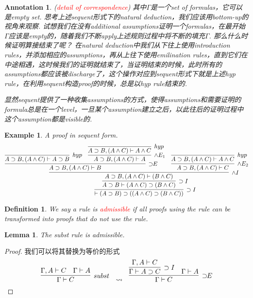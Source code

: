 \documentclass{article}
\theoremstyle{plain}
\newtheorem{lemma}[theorem]{Lemma}
\newtheorem{example}[theorem]{Example}
\newtheorem{definition}[theorem]{Definition}
\newtheorem{annotation}[theorem]{Annotation}
\theoremstyle{nonumberplain}
\newtheorem{proof}{Proof}
\newcommand{\redt}[1]{\textcolor{red}{#1}}
\begin{document}
\begin{annotation}
\rm (\redt{detail of correspondence}) 其中$\Gamma$是一个set of formulas，它可以是empty set. 思考上述sequent形式下的natural deduction，我们应该用bottom-up的视角来观察. 试想我们在没有additional assumptions证明一个formulas，在最开始$\Gamma$应该是empty的，随着我们不断apply上述规则过程中将不断的填充$\Gamma$. 那么什么时候证明算接结束了呢？ 在natural deduction中我们从下往上使用introduction rules，并添加相应的assumptions，再从上往下使用emilination rules，直到它们在中途相遇，这时候我们的证明就结束了，当证明结束的时候，此时所有的assumptions都应该被discharge了，这个操作对应到sequent形式下就是上述hyp rule，在利用sequent构造proof的时候，总是以hyp rule结束的.

显然sequent提供了一种收集assumptions的方式，使得assumptions和需要证明的formula总是在一个level，一旦某个assumption建立之后，以此往后的证明过程中这个assumption都是visible的.    
\end{annotation}

\begin{example}
\rm A proof in sequent form.
$$
\infer[\supset I]{\vdash (A \supset B) \supset ((A\wedge C) \supset (B \wedge C) ) }{\infer[\supset I]{A \supset B \vdash (A\wedge C) \supset (B \wedge C)}{\infer[\wedge I]{A \supset B,(A\wedge C) \vdash  (B \wedge C)}{\infer[\supset\!\!E]{A \supset B,(A\wedge C) \vdash B}{\infer[hyp]{A \supset B,(A\wedge C) \vdash A \supset B}{} & \infer[\wedge E_1]{A \supset B,(A\wedge C) \vdash A}{\infer[hyp]{A \supset B,(A\wedge C) \vdash A \wedge C}{}} } & \infer[\wedge E_2]{A \supset B,(A\wedge C) \vdash C}{\infer[hyp]{A \supset B,(A\wedge C) \vdash A \wedge C}{}}}}}
$$
\end{example}

\begin{definition}
\rm We say a rule is \redt{admissible} if all proofs using the rule can be transformed into proofs that do not use the rule.
\end{definition}

\begin{lemma}
\rm The \emph{subst} rule is admissible.
\end{lemma}

\begin{proof}
我们可以将其替换为等价的形式
$$
\infer[subst]{\Gamma \vdash C}{\Gamma, A \vdash C & \Gamma \vdash A} ~~\leadsto ~~ \infer[\supset\!\!E]{\Gamma \vdash C}{\infer[\supset I]{\Gamma \vdash A \supset C}{\Gamma, A \vdash C} & \Gamma \vdash A}
$$
\end{proof}
\end{document}
